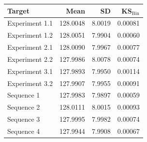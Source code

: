 \begin{tabular}{lrrr}
\hline
Target & Mean & SD & KS$_{\mathrm{Bin}}$ \\
\hline
Experiment 1.1 & 128.0048 & 8.0019 & 0.00081 \\
Experiment 1.2 & 128.0051 & 7.9904 & 0.00060 \\
Experiment 2.1 & 128.0090 & 7.9967 & 0.00077 \\
Experiment 2.2 & 127.9986 & 8.0078 & 0.00074 \\
Experiment 3.1 & 127.9893 & 7.9950 & 0.00114 \\
Experiment 3.2 & 127.9907 & 7.9955 & 0.00091 \\
Sequence 1 & 127.9983 & 7.9897 & 0.00059 \\
Sequence 2 & 128.0111 & 8.0015 & 0.00093 \\
Sequence 3 & 127.9995 & 7.9982 & 0.00074 \\
Sequence 4 & 127.9944 & 7.9908 & 0.00067 \\
\hline
\end{tabular}
